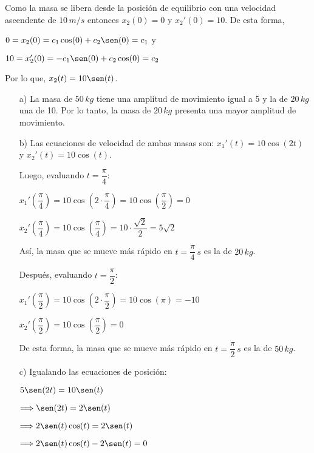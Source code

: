\documentclass[fleqn]{article}
\begin{document}
    Como la masa se libera desde la posición de equilibrio con una velocidad ascendente de $ 10 \, m/s $ entonces $ x_2(0) = 0 $ y $ x_2'(0) = 10 $. De esta forma,

    $ 0 = x_2(0) = c_1 \cos (0) + c_2 \sen(0) = c_1 $ y

    $ 10 = x_2'(0) = -c_1 \sen (0) + c_2 \cos(0) = c_2 $

    Por lo que, $ x_2(t) = 10 \sen (t) $.

    \begin{enumerate}
        \item[a)] La masa de $ 50 \, kg $ tiene una amplitud de movimiento igual a 5 y la de $ 20 \, kg $ una de 10. Por lo tanto, la masa de $ 20 \, kg $ presenta una mayor amplitud de movimiento.
        
        \item[b)] Las ecuaciones de velocidad de ambas masas son: $ x_1'(t) = 10 \cos (2t) $ y $ x_2'(t) = 10 \cos (t) $.
        
        Luego, evaluando $ t = \dfrac{\pi}{4} $:

        $ x_1' \left(\dfrac{\pi}{4} \right) = 10 \cos \left(2 \cdot \dfrac{\pi}{4} \right) = 10 \cos \left(\dfrac{\pi}{2} \right) = 0 $

        $ x_2'\left(\dfrac{\pi}{4} \right) = 10 \cos \left(\dfrac{\pi}{4} \right) = 10 \cdot \dfrac{\sqrt{2}}{2} = 5 \sqrt{2} $

        Así, la masa que se mueve más rápido en $ t = \dfrac{\pi}{4} \, s $ es la de $ 20 \, kg $.

        Después, evaluando $ t = \dfrac{\pi}{2} $:

        $ x_1' \left(\dfrac{\pi}{2} \right) = 10 \cos \left(2 \cdot \dfrac{\pi}{2} \right) = 10 \cos (\pi) = -10 $

        $ x_2'\left(\dfrac{\pi}{2} \right) = 10 \cos \left(\dfrac{\pi}{2} \right) = 0 $

        De esta forma, la masa que se mueve más rápido en $ t = \dfrac{\pi}{2} \, s $ es la de $ 50 \, kg $.

        \item[c)] Igualando las ecuaciones de posición:
        
        $ 5 \sen (2t) = 10 \sen (t) $

        $ \Longrightarrow \sen (2t) = 2 \sen (t) $

        $ \Longrightarrow 2 \sen (t) \cos (t) = 2 \sen (t) $

        $ \Longrightarrow 2 \sen (t) \cos (t) - 2 \sen (t) = 0 $


\end{enumerate}
\end{document}
